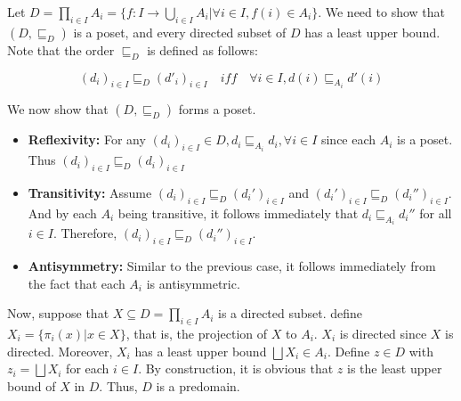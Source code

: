 Let $D = \prod_{i \in I} A_i = \{ f : I \to \bigcup_{i \in I} A_i | \forall i \in I, f(i) \in A_i \}$. We need to show that $(D, \sqsubseteq_D)$ is a poset, and every directed subset of $D$ has a least upper bound. Note that the order $\sqsubseteq_D$ is defined as follows:

$$ (d_i)_{i \in I} \sqsubseteq_D (d'_i)_{i \in I} \quad iff \quad \forall i \in I, d(i) \sqsubseteq_{A_i} d'(i) $$

We now show that $(D, \sqsubseteq_D)$ forms a poset. 
\begin{itemize}
    \item \textbf{Reflexivity:} For any $(d_i)_{i \in I} \in D, d_i \sqsubseteq_{A_i} d_i, \forall i \in I$ since each $A_i$ is a poset. Thus $(d_i)_{i \in I} \sqsubseteq_D (d_i)_{i \in I}$
    \item \textbf{Transitivity:} Assume $(d_i)_{i \in I} \sqsubseteq_D (d_i')_{i \in I}$ and $(d_i')_{i \in I} \sqsubseteq_D (d_i'')_{i \in I}$. And by each $A_i$ being transitive, it follows immediately that $d_i \sqsubseteq_{A_i} d_i''$ for all $i \in I$. Therefore, $(d_i)_{i \in I} \sqsubseteq_D (d_i'')_{i \in I}$.
    \item \textbf{Antisymmetry:} Similar to the previous case, it follows immediately from the fact that each $A_i$ is antisymmetric.
\end{itemize}

Now, suppose that $X \subseteq D = \prod_{i \in I} A_i$ is a directed subset. define 
    $X_i = \{ \pi_i(x) | x \in X \} $, that is, the projection of $X$ to $A_i$. $X_i$ is directed since $X$ is directed.
    Moreover, $X_i$ has a least upper bound $ \bigsqcup X_i \in A_i $. Define $z \in D$
    with $z_i = \bigsqcup X_i$ for each $i \in I$. By construction, it is obvious that $z$ is the least upper bound of $X$ in $D$.
    Thus, $D$ is a predomain.
